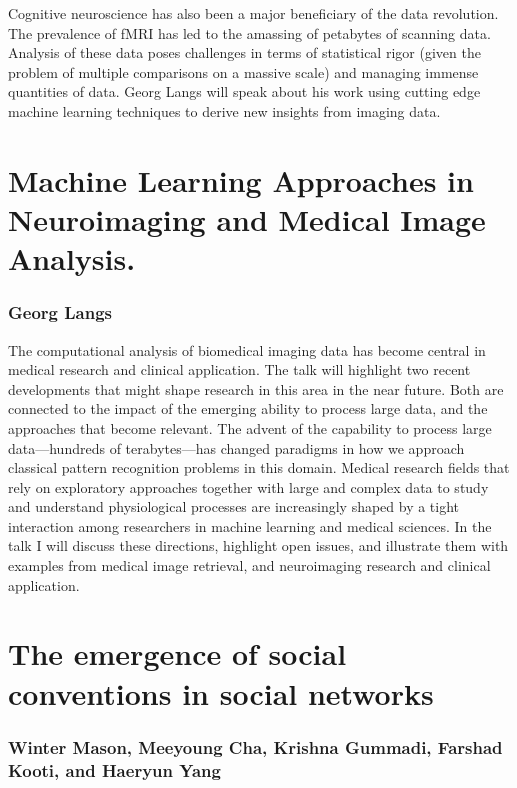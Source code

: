 \documentclass[10pt,letterpaper]{article}
\begin{document}
Cognitive neuroscience has also been a major beneficiary of the data revolution.
The prevalence of fMRI has led to the amassing of petabytes of scanning data.
Analysis of these data poses challenges in terms of statistical rigor (given the
problem of multiple comparisons on a massive scale) and managing immense
quantities of data. Georg Langs will speak about his work using cutting edge
machine learning techniques to derive new insights from imaging data.

\section{Machine Learning Approaches in Neuroimaging and Medical Image Analysis.}
\subsubsection{Georg Langs}

The computational analysis of biomedical imaging data has become central in
medical research and clinical application. The talk will highlight two recent
developments that might shape research in this area in the near future. Both are
connected to the impact of the emerging ability to process large data, and the
approaches that become relevant. The advent of the capability to process large
data---hundreds of terabytes---has changed paradigms in how we approach classical
pattern recognition problems in this domain. Medical research fields that rely on
exploratory approaches together with large and complex data to study and
understand physiological processes are increasingly shaped by a tight interaction
among researchers in machine learning and medical sciences. In the talk I will
discuss these directions, highlight open issues, and illustrate them
with examples from medical image retrieval, and neuroimaging research and
clinical application.

\section{The emergence of social conventions in social networks}
\subsubsection{Winter Mason, Meeyoung Cha, Krishna Gummadi, Farshad Kooti, and Haeryun Yang}
\end{document}
